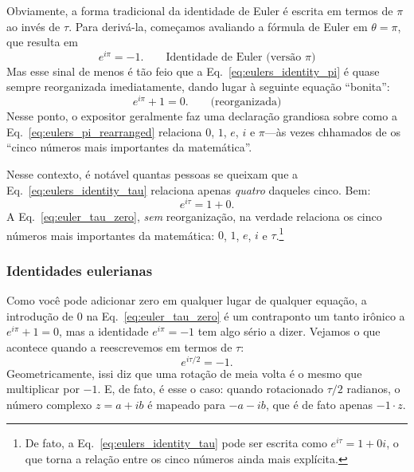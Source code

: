 {Obviamente, a forma tradicional da identidade de Euler é escrita em termos de $\pi$ ao invés de $\tau$. Para derivá-la, começamos avaliando a fórmula de Euler em $\theta = \pi$, que resulta em
\begin{equation}
\label{eq:eulers_identity_pi}
e^{i\pi} = -1. \qquad\mbox{Identidade de Euler (versão $\pi$)}
\end{equation}
Mas esse sinal de menos é tão feio que a Eq.~\eqref{eq:eulers_identity_pi} é quase sempre reorganizada imediatamente, dando lugar à seguinte equação ``bonita'':
\begin{equation}
\label{eq:eulers_pi_rearranged}
e^{i\pi} + 1 = 0. \qquad\mbox{(reorganizada)}
\end{equation}
Nesse ponto, o expositor geralmente faz uma declaração grandiosa sobre como a Eq.~\eqref{eq:eulers_pi_rearranged} relaciona $0$, $1$, $e$, $i$ e $\pi$---às vezes chhamados de os ``cinco números mais importantes da matemática''.

Nesse contexto, é notável quantas pessoas se queixam que a Eq.~\eqref{eq:eulers_identity_tau} relaciona apenas \emph{quatro} daqueles cinco. Bem:
\begin{equation}
\label{eq:euler_tau_zero}
e^{i\tau} = 1 + 0.
\end{equation}
A Eq.~\eqref{eq:euler_tau_zero}, \emph{sem} reorganização, na verdade relaciona os cinco números mais importantes da matemática: $0$, $1$, $e$, $i$ e $\tau$.\footnote{De fato, a Eq.~\eqref{eq:eulers_identity_tau} pode ser escrita como $e^{i\tau} = 1 + 0i$, o que torna a relação entre os cinco números ainda mais explícita.}

      \subsubsection{Identidades eulerianas} %
      \label{sec:eulerian_identities}

Como você pode adicionar zero em qualquer lugar de qualquer equação, a introdução de $0$ na Eq.~\eqref{eq:euler_tau_zero} é um contraponto um tanto irônico a $e^{i\pi} + 1 = 0$, mas a identidade $e^{i\pi} = -1$ tem algo sério a dizer. Vejamos o que acontece quando a reescrevemos em termos de $\tau$:
\[
e^{i\tau/2} = -1.
\]
Geometricamente, issi diz que uma rotação de meia volta é o mesmo que multiplicar por $-1$. E, de fato, é esse o caso: quando rotacionado $\tau/2$ radianos, o número complexo $z = a + ib$ é mapeado para $-a - ib$, que é de fato apenas $-1\cdot z$.

}
